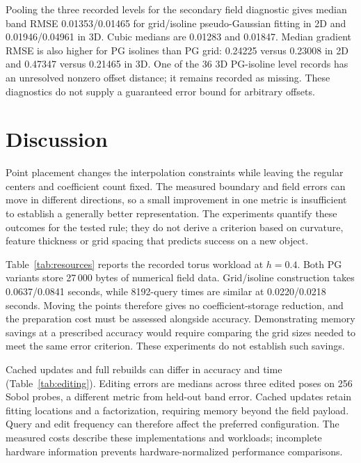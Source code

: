 \documentclass[12pt,letterpaper]{article}
\begin{document}
Pooling the three recorded levels for the secondary field diagnostic gives median band RMSE 0.01353/0.01465 for grid/isoline pseudo-Gaussian fitting in 2D and 0.01946/0.04961 in 3D. Cubic medians are 0.01283 and 0.01847. Median gradient RMSE is also higher for PG isolines than PG grid: 0.24225 versus 0.23008 in 2D and 0.47347 versus 0.21465 in 3D. One of the 36 3D PG-isoline level records has an unresolved nonzero offset distance; it remains recorded as missing. These diagnostics do not supply a guaranteed error bound for arbitrary offsets.

\section{Discussion}
Point placement changes the interpolation constraints while leaving the regular centers and coefficient count fixed. The measured boundary and field errors can move in different directions, so a small improvement in one metric is insufficient to establish a generally better representation. The experiments quantify these outcomes for the tested rule; they do not derive a criterion based on curvature, feature thickness or grid spacing that predicts success on a new object.

Table~\ref{tab:resources} reports the recorded torus workload at $h=0.4$. Both PG variants store 27\,000 bytes of numerical field data. Grid/isoline construction takes 0.0637/0.0841 seconds, while 8192-query times are similar at 0.0220/0.0218 seconds. Moving the points therefore gives no coefficient-storage reduction, and the preparation cost must be assessed alongside accuracy. Demonstrating memory savings at a prescribed accuracy would require comparing the grid sizes needed to meet the same error criterion. These experiments do not establish such savings.
\begin{table}[htbp]\centering\resizebox{\linewidth}{!}{}\caption{Torus resource cases at $h=0.4$, angle $47^\circ$, shift $0.01$, extraction $31^3$. $H$ is the mean sampled distance over $t=-0.1,0,0.1$; query time is for 8192 points. Tuning is reported separately.}\label{tab:resources}\end{table}

Cached updates and full rebuilds can differ in accuracy and time (Table~\ref{tab:editing}). Editing errors are medians across three edited poses on 256 Sobol probes, a different metric from held-out band error. Cached updates retain fitting locations and a factorization, requiring memory beyond the field payload. Query and edit frequency can therefore affect the preferred configuration. The measured costs describe these implementations and workloads; incomplete hardware information prevents hardware-normalized performance comparisons.
\begin{table}[htbp]\centering\resizebox{\linewidth}{!}{}\caption{Editing for the torus cases of Table~\ref{tab:resources}. RMSE is the median of the three recorded edit errors.}\label{tab:editing}\end{table}
\end{document}
